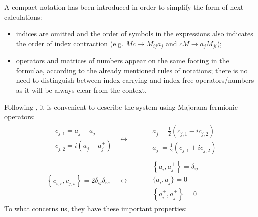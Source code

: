 \documentclass[a4paper,11pt]{article}
\theoremstyle{remark}
\newcommand{\ns}{\vskip 0.8cm}
\newcommand{\np}{\vskip 1.3cm}
\begin{document}
   A compact notation has been introduced in order to simplify the form of next calculations: 
   \begin{itemize}
   \item indices are omitted and the order of symbols in the expressions also indicates the order of index contraction (e.g. $Mc\rightarrow M_{ij}a_j$ and $cM \rightarrow a_j M_{ji}$);
   \item operators and matrices of numbers appear on the same footing in the formulae, according to the already mentioned rules of notations; there is no need to distinguish between index-carrying and index-free operators/numbers as it will be always clear from the context.
   \end{itemize}
   \ns
   Following \cite{Eisert2010}, it is convenient to describe the system using Majorana fermionic operators:
   \begin{subequations}
   \label{eq:def_majorana}
   \begin{align}
   &\begin{aligned}
    &c^{ }_{j, 1} = a_j^{ }+a_j^{+} \\
    &c^{ }_{j, 2} = i(a_j^{ }-a_j^{+})
   \end{aligned}
   &\longleftrightarrow&
   & &\begin{aligned}
    &a_j^{ }=\frac{1}{2}\left(c^{ }_{j, 1}-ic^{ }_{j, 2}\right)\\
    &a_j^+=\frac{1}{2}\left(c^{ }_{j, 1}+ic^{ }_{j, 2}\right)
   \end{aligned}\\[0.3 cm]
   &\left\{c^{ }_{i,r},c^{ }_{j,s}\right\} = 2\delta_{ij}\delta_{rs}
   &\longleftrightarrow&
   & &\begin{aligned}
    &\left\{a^{ }_{i},a^{+}_{j}\right\} = \delta_{ij} \\
    &\big\{a^{ }_{i},a^{ }_{j}\big\} = 0 \\
    &\left\{a^{+}_{i},a^{+}_{j}\right\} = 0 
    \end{aligned}
   \end{align}
   \end{subequations}\np
   To what concerns us, they have these important properties:
\end{document}

